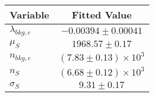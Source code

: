 \begin{tabular}[t]{lc}
\hline
Variable &Fitted Value\\
\hline\hline
$\lambda_{bkg,c}$&$-0.00394\pm0.00041$\\
\hline
$\mu_{S}$&$1968.57\pm0.17$\\
\hline
$n_{bkg,c}$&$(7.83\pm0.13)\times 10^3$\\
\hline
$n_{S}$&$(6.68\pm0.12)\times 10^3$\\
\hline
$\sigma_{S}$&$9.31\pm0.17$\\
\hline
\end{tabular}
